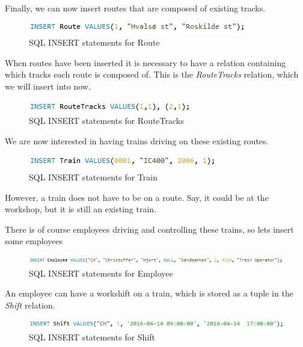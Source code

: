 Finally, we can now insert routes that are composed of existing tracks.

\begin{figure}[ht!]
    \centering
    \includegraphics[width=.6\textwidth]{img/INSERT_Statements_Route}
    \caption{SQL INSERT statements for Route}
\end{figure}

When routes have been inserted it is necessary to have a relation containing 
which tracks each route is composed of. This is the \emph{RouteTracks} 
relation, which we will insert into now.

\begin{figure}[ht!]
    \centering
    \includegraphics[width=.5\textwidth]{img/INSERT_Statements_RouteTracks}
    \caption{SQL INSERT statements for RouteTracks}
\end{figure}

We are now interested in having trains driving on these existing routes.

\begin{figure}[ht!]
    \centering
    \includegraphics[width=.5\textwidth]{img/INSERT_Statements_Train}
    \caption{SQL INSERT statements for Train}
\end{figure}

However, a train does not have to be on a route. Say, it could be at the 
workshop, but it is still an existing train.

There is of course employees driving and controlling these trains, so lets 
insert some employees

\begin{figure}[ht!]
    \centering
    \includegraphics[width=1\textwidth]{img/INSERT_Statements_Employee}
    \caption{SQL INSERT statements for Employee}
\end{figure}

An employee can have a workshift on a train, which is stored as a tuple in the 
\emph{Shift} relation.

\begin{figure}[ht!]
    \centering
    \includegraphics[width=.9\textwidth]{img/INSERT_Statements_Shift}
    \caption{SQL INSERT statements for Shift}
\end{figure}

